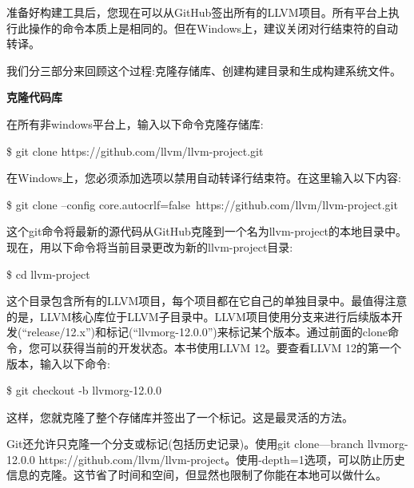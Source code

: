 准备好构建工具后，您现在可以从GitHub签出所有的LLVM项目。所有平台上执行此操作的命令本质上是相同的。但在Windows上，建议关闭对行结束符的自动转译。\par

我们分三部分来回顾这个过程:克隆存储库、创建构建目录和生成构建系统文件。\par

\hspace*{\fill} \par %
\textbf{克隆代码库}

在所有非windows平台上，输入以下命令克隆存储库:\par

\begin{tcolorbox}[colback=white,colframe=black]
	\$ git clone https://github.com/llvm/llvm-project.git
\end{tcolorbox}

在Windows上，您必须添加选项以禁用自动转译行结束符。在这里输入以下内容:\par

\begin{tcolorbox}[colback=white,colframe=black]
	\$ git clone --config core.autocrlf=false\ https://github.com/llvm/llvm-project.git
\end{tcolorbox}

这个git命令将最新的源代码从GitHub克隆到一个名为llvm-project的本地目录中。现在，用以下命令将当前目录更改为新的llvm-project目录:\par

\begin{tcolorbox}[colback=white,colframe=black]
	\$ cd llvm-project
\end{tcolorbox}

这个目录包含所有的LLVM项目，每个项目都在它自己的单独目录中。最值得注意的是，LLVM核心库位于LLVM子目录中。LLVM项目使用分支来进行后续版本开发(“release/12.x”)和标记(“llvmorg-12.0.0”)来标记某个版本。通过前面的clone命令，您可以获得当前的开发状态。本书使用LLVM 12。要查看LLVM 12的第一个版本，输入以下命令:\par

\begin{tcolorbox}[colback=white,colframe=black]
	\$ git checkout -b llvmorg-12.0.0
\end{tcolorbox}

这样，您就克隆了整个存储库并签出了一个标记。这是最灵活的方法。\par

Git还允许只克隆一个分支或标记(包括历史记录)。使用git clone—branch llvmorg-12.0.0 https://github.com/llvm/llvm-project。使用-depth=1选项，可以防止历史信息的克隆。这节省了时间和空间，但显然也限制了你能在本地可以做什么。\par

